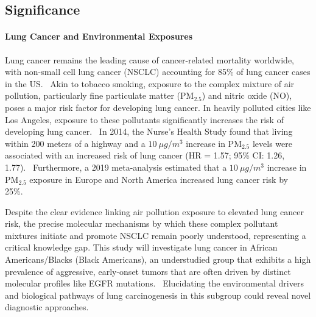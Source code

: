 \subsection{Significance}





\paragraph{Lung Cancer and Environmental Exposures}
Lung cancer remains the leading cause of cancer-related mortality worldwide, with non-small cell lung cancer (NSCLC) 
accounting for 85\% of lung cancer cases in the US.~\cite{molina_nonsmall_2008} 
Akin to tobacco smoking, exposure to the complex mixture of air pollution, particularly fine particulate matter (PM$_{2.5}$) and nitric oxide (NO), 
poses a major risk factor for developing lung cancer. 
In heavily polluted cities like Los Angeles, exposure to these pollutants significantly increases the risk of developing lung cancer.~\cite{berg_air_2023,huang_air_2021} 
In 2014, the Nurse's Health Study found that living within 200 meters of a highway and a $10~\mu g/m^{3}$ increase in PM$_{2.5}$ 
levels were associated with an increased risk of lung cancer (HR = 1.57; 95\% CI: 1.26, 1.77).~\cite{puett_particulate_2014} 
Furthermore, a 2019 meta-analysis estimated that a $10~\mu g/m^{3}$ increase in PM$_{2.5}$ exposure in Europe and North America increased lung cancer risk by 25\%.~\cite{huang_ambient_2021}

\vspace{1em}
\noindent
Despite the clear evidence linking air pollution exposure to elevated lung cancer risk, 
the precise molecular mechanisms by which these complex pollutant mixtures initiate and promote NSCLC remain poorly understood, 
representing a critical knowledge gap. 
This study will investigate lung cancer in African Americans/Blacks (Black Americans), an understudied group that exhibits a high prevalence of aggressive, 
early-onset tumors that are often driven by distinct molecular profiles like EGFR mutations.~\cite{marcinkiewicz_impact_2023}
Elucidating the environmental drivers and biological pathways of lung carcinogenesis in this subgroup could reveal novel diagnostic approaches. 

